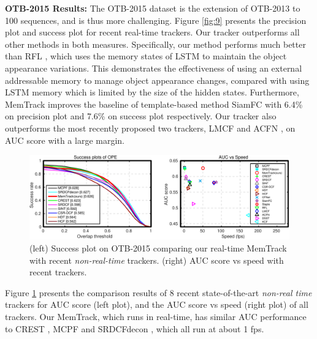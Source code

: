 \documentclass[runningheads]{llncs}
\begin{document}
\textbf{OTB-2015 Results:} The OTB-2015 \cite{Wu2015} dataset is the extension of OTB-2013 to 100 sequences, and is thus more challenging.
Figure \ref{fig:9} presents the precision plot and success plot for recent real-time trackers. Our tracker outperforms all other methods in both measures. Specifically, our method performs much better than RFL \cite{Yang2017}, which uses the memory states of LSTM to maintain the object appearance variations. This demonstrates the effectiveness of using an external addressable memory to manage object appearance changes, compared with using LSTM memory which is limited by the size of the hidden states.
Furthermore, MemTrack improves the baseline of template-based method SiamFC \cite{Bertinetto2016} with 6.4\% on precision plot and 7.6\% on success plot respectively. %
Our tracker also outperforms the most recently proposed two trackers, LMCF \cite{Wang2017} and ACFN \cite{Choi2017}, on AUC score with a large margin.
\begin{figure}[t]
	\begin{center}
		\includegraphics[width=0.85\linewidth]{slow-tb100.pdf}
	\end{center}
	\vspace{-5mm}
	\caption{(left) Success plot on OTB-2015 comparing our real-time MemTrack with recent {\em non-real-time} trackers. (right) AUC score vs speed with recent trackers.}
	\label{fig:10}
\end{figure}
Figure \ref{fig:10} presents the comparison results of 8 recent state-of-the-art {\em non-real time} trackers for AUC score (left plot), and the AUC score vs speed (right plot) of all trackers.
Our MemTrack, which runs in real-time, has similar AUC performance to CREST \cite{Song2017}, MCPF \cite{Zhang2017} and SRDCFdecon \cite{Danelljan2016}, which all run at about 1 fps.
\end{document}
